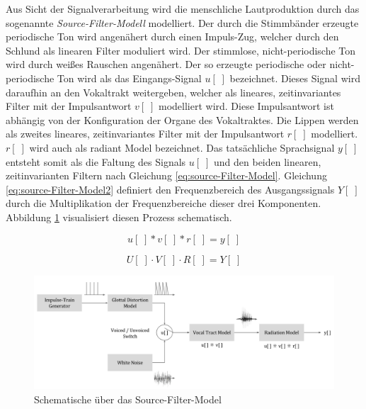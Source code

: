 Aus Sicht der Signalverarbeitung wird die menschliche Lautproduktion durch das sogenannte \emph{Source-Filter-Modell} modelliert. Der durch die Stimmbänder erzeugte periodische Ton wird angenähert durch einen Impuls-Zug, welcher durch den Schlund als linearen Filter moduliert wird. Der stimmlose, nicht-periodische Ton wird durch weißes Rauschen angenähert. Der so erzeugte periodische oder nicht-periodische Ton wird als das Eingangs-Signal $u[\;]$ bezeichnet. Dieses Signal wird daraufhin an den Vokaltrakt weitergeben, welcher als lineares, zeitinvariantes Filter mit der Impulsantwort $v[\;]$ modelliert wird. Diese Impulsantwort ist abhängig von der Konfiguration der Organe des Vokaltraktes. Die Lippen werden als zweites lineares, zeitinvariantes Filter mit der Impulsantwort $r[\;]$ modelliert. $r[\;]$ wird auch als \glqq radiant Model\grqq{} bezeichnet. Das tatsächliche Sprachsignal $y[\;]$ entsteht somit als die Faltung des Signals $u[\;]$ und den beiden linearen, zeitinvarianten Filtern nach Gleichung \ref{eq:source-Filter-Model}. Gleichung \ref{eq:source-Filter-Model2} definiert den Frequenzbereich des Ausgangssignals $Y[\;]$ durch die Multiplikation der Frequenzbereiche dieser drei Komponenten. Abbildung \ref{img:source-filter-model} visualisiert diesen Prozess schematisch. \cite[S. 62 - 63]{cryModel} \cite{speechProduction}

\begin{equation}
u[\;] * v[\;] * r[\;] = y[\;] 
\label{eq:source-Filter-Model}
\end{equation}

\begin{equation}
U[\;] \cdot V[\;] \cdot R[\;] = Y[\;] 
\label{eq:source-Filter-Model2}
\end{equation}

\begin{figure}[h]
	\centering
	\includegraphics[width=1\textwidth]{bilder/source-filter-model.png}
	\caption{Schematische über das Source-Filter-Model \cite[nach Source estimation, S. 17]{ricardo_ceps}}
	\label{img:source-filter-model}
\end{figure}	

